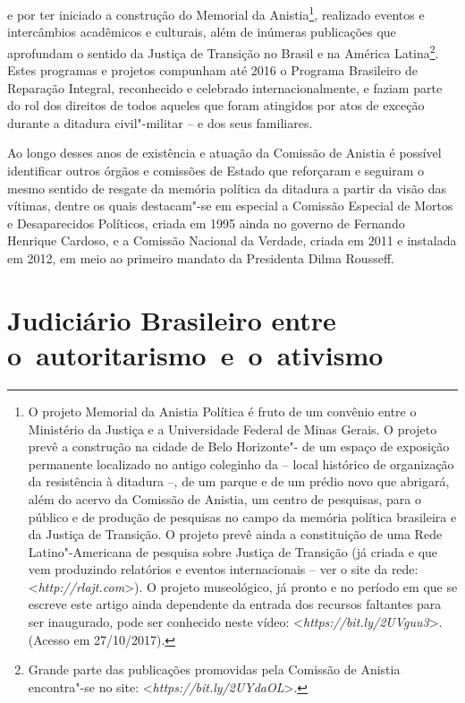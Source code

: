   e por ter iniciado a construção do Memorial
da Anistia\footnote{O projeto Memorial da Anistia Política é fruto de um
  convênio entre o Ministério da Justiça e a Universidade Federal de
  Minas Gerais. O projeto prevê a construção na cidade de Belo
  Horizonte"- de um espaço de exposição permanente localizado no antigo
  coleginho da  -- local histórico de organização da resistência à
  ditadura --, de um parque e de um prédio novo que abrigará, além do acervo da
  Comissão de Anistia, um centro de pesquisas, para o público e de
  produção de pesquisas no campo da memória política brasileira e da
  Justiça de Transição. O projeto prevê ainda a constituição de uma Rede
  Latino"-Americana de pesquisa sobre Justiça de Transição (já criada e
  que vem produzindo relatórios e eventos internacionais -- ver o site da
  rede: \textless{}\emph{http://rlajt.com}\textgreater{}).
  O projeto museológico, já pronto e no
  período em que se escreve este artigo ainda dependente da entrada dos
  recursos faltantes para ser inaugurado, pode ser conhecido neste
  vídeo: \textless{}\emph{https://bit.ly/2UVguu3}\textgreater{}. (Acesso em
  27/10/2017).}, realizado eventos e intercâmbios acadêmicos e
culturais, além de inúmeras publicações que aprofundam o sentido da
Justiça de Transição no Brasil e na América Latina\footnote{Grande parte
  das publicações promovidas pela Comissão de Anistia encontra"-se no
  site: \textless{}\emph{https://bit.ly/2UYdaOL}\textgreater{}.}.
  Estes programas e projetos compunham até 2016 o Programa
Brasileiro de Reparação Integral, reconhecido e celebrado
internacionalmente, e faziam parte do rol dos direitos de todos aqueles
que foram atingidos por atos de exceção durante a ditadura civil"-militar --
e dos seus familiares.

Ao longo desses anos de existência e atuação da Comissão de Anistia é
possível identificar outros órgãos e comissões de Estado que reforçaram
e seguiram o mesmo sentido de resgate da memória política da ditadura a
partir da visão das vítimas, dentre os quais destacam"-se em especial a
Comissão Especial de Mortos e Desaparecidos Políticos, criada em 1995
ainda no governo de Fernando Henrique Cardoso, e a Comissão Nacional da
Verdade, criada em 2011 e instalada em 2012, em meio ao primeiro mandato
da Presidenta Dilma Rousseff.

\section{Judiciário Brasileiro entre o~autoritarismo~e~o~ativismo}

